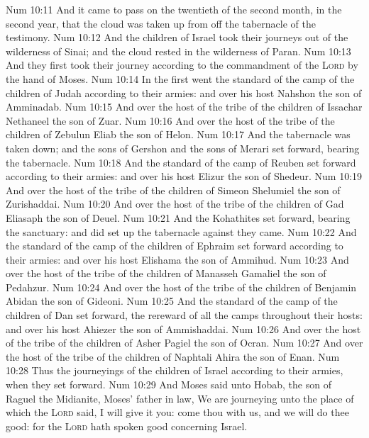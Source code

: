 \vs Num 10:11 And it came to pass on the twentieth  of the second month, in the second year, that the cloud was taken up from off the tabernacle of the testimony.
\vs Num 10:12 And the children of Israel took their journeys out of the wilderness of Sinai; and the cloud rested in the wilderness of Paran.
\vs Num 10:13 And they first took their journey according to the commandment of the \textsc{Lord} by the hand of Moses.
\vs Num 10:14 In the first  went the standard of the camp of the children of Judah according to their armies: and over his host  Nahshon the son of Amminadab.
\vs Num 10:15 And over the host of the tribe of the children of Issachar  Nethaneel the son of Zuar.
\vs Num 10:16 And over the host of the tribe of the children of Zebulun  Eliab the son of Helon.
\vs Num 10:17 And the tabernacle was taken down; and the sons of Gershon and the sons of Merari set forward, bearing the tabernacle.
\vs Num 10:18 And the standard of the camp of Reuben set forward according to their armies: and over his host  Elizur the son of Shedeur.
\vs Num 10:19 And over the host of the tribe of the children of Simeon  Shelumiel the son of Zurishaddai.
\vs Num 10:20 And over the host of the tribe of the children of Gad  Eliasaph the son of Deuel.
\vs Num 10:21 And the Kohathites set forward, bearing the sanctuary: and  did set up the tabernacle against they came.
\vs Num 10:22 And the standard of the camp of the children of Ephraim set forward according to their armies: and over his host  Elishama the son of Ammihud.
\vs Num 10:23 And over the host of the tribe of the children of Manasseh  Gamaliel the son of Pedahzur.
\vs Num 10:24 And over the host of the tribe of the children of Benjamin  Abidan the son of Gideoni.
\vs Num 10:25 And the standard of the camp of the children of Dan set forward,  the rereward of all the camps throughout their hosts: and over his host  Ahiezer the son of Ammishaddai.
\vs Num 10:26 And over the host of the tribe of the children of Asher  Pagiel the son of Ocran.
\vs Num 10:27 And over the host of the tribe of the children of Naphtali  Ahira the son of Enan.
\vs Num 10:28 Thus  the journeyings of the children of Israel according to their armies, when they set forward.
\vs Num 10:29 And Moses said unto Hobab, the son of Raguel the Midianite, Moses' father in law, We are journeying unto the place of which the \textsc{Lord} said, I will give it you: come thou with us, and we will do thee good: for the \textsc{Lord} hath spoken good concerning Israel.
